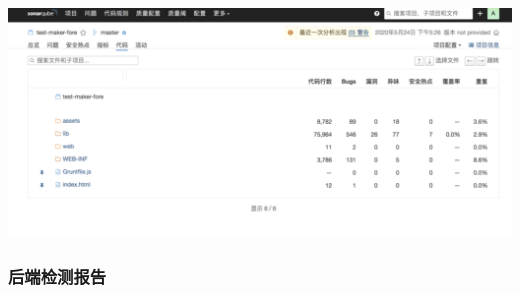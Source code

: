 \documentclass[hyperref, a4paper]{ctexart}
\begin{document}
\includegraphics{screenshots/lab7-pic/fore-6.png}

\hypertarget{ux540eux7aefux68c0ux6d4bux62a5ux544a}{%
\subsubsection{后端检测报告}\label{ux540eux7aefux68c0ux6d4bux62a5ux544a}}
\end{document}
